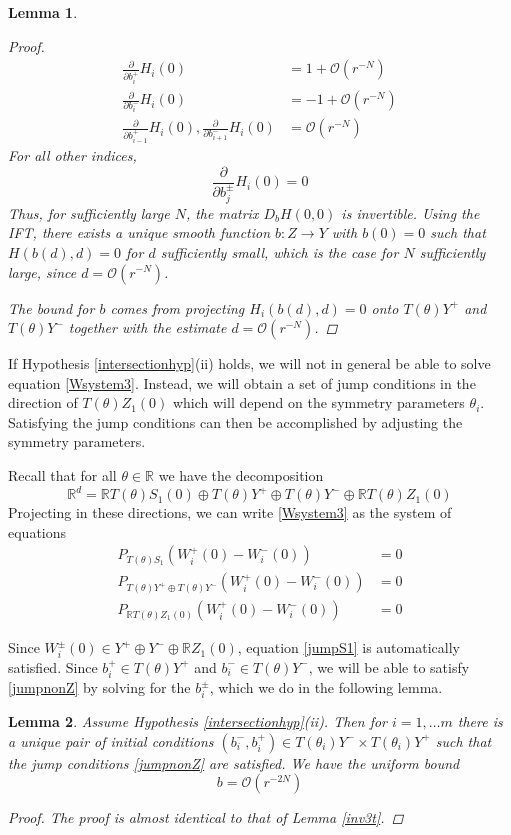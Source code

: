 \documentclass[12pt]{article}
\def\R{{\mathbb R}}
\newtheorem{lemma}{Lemma}
\begin{document}
\begin{lemma}
\begin{proof}
\begin{align*}
\frac{\partial}{\partial b_i^+}H_i(0) &= 1 + \mathcal{O}(r^{-N})  \\
\frac{\partial}{\partial b_i^-}H_i(0) &= -1 + \mathcal{O}(r^{-N}) \\
\frac{\partial}{\partial b_{i-1}^+}H_i(0),
\frac{\partial}{\partial b_{i+1}^-}H_i(0) &= \mathcal{O}(r^{-N})
\end{align*}
For all other indices,
\[
\frac{\partial}{\partial b_j^\pm}H_i(0) = 0
\]
Thus, for sufficiently large $N$, the matrix $D_b H(0,0)$ is invertible. Using the IFT, there exists a unique smooth function $b: Z \rightarrow Y$ with $b(0) = 0$ such that $H(b(d),d) = 0$ for $d$ sufficiently small, which is the case for $N$ sufficiently large, since $d = \mathcal{O}(r^{-N})$.

The bound for $b$ comes from projecting $H_i(b(d), d) = 0$ onto $T(\theta)Y^+$ and $T(\theta)Y^-$ together with the estimate $d = \mathcal{O}(r^{-N})$.
\end{proof}
\end{lemma}

If Hypothesis \ref{intersectionhyp}(ii) holds, we will not in general be able to solve equation \eqref{Wsystem3}. Instead, we will obtain a set of jump conditions in the direction of $T(\theta) Z_1(0)$ which will depend on the symmetry parameters $\theta_i$. Satisfying the jump conditions can then be accomplished by adjusting the symmetry parameters.

Recall that for all $\theta \in \R$ we have the decomposition
\[
\R^d = \R T(\theta) S_1(0) \oplus T(\theta) Y^+ \oplus T(\theta) Y^- \oplus \R T(\theta) Z_1(0)
\]
Projecting in these directions, we can write \eqref{Wsystem3} as the system of equations
\begin{align}
P_{T(\theta)S_1}\left( W_i^+(0) - W_i^-(0) \right) &= 0 \label{jumpS1} \\
P_{T(\theta)Y^+ \oplus T(\theta)Y^-}\left( W_i^+(0) - W_i^-(0) \right) &= 0 \label{jumpnonZ} \\
P_{\R T(\theta)Z_1(0)} \left( W_i^+(0) - W_i^-(0) \right) &= 0 \label{jumpZ}
\end{align}

Since $W_i^\pm(0) \in Y^+ \oplus Y^- \oplus \R Z_1(0)$, equation \ref{jumpS1} is automatically satisfied. Since $b_i^+ \in T(\theta) Y^+$ and $b_i^- \in T(\theta) Y^-$, we will be able to satisfy \eqref{jumpnonZ} by solving for the $b_i^\pm$, which we do in the following lemma.

\begin{lemma}\label{inv3nt}
Assume Hypothesis \ref{intersectionhyp}(ii). Then for $i = 1, \dots m$ there is a unique pair of initial conditions $(b_i^-, b_i^+) \in T(\theta_i) Y^- \times T(\theta_i) Y^+$ such that the jump conditions \eqref{jumpnonZ} are satisfied. We have the uniform bound
\begin{equation}\label{bboundt}
b = \mathcal{O}(r^{-2N})
\end{equation}
\begin{proof}
The proof is almost identical to that of Lemma \ref{inv3t}.
\end{proof}
\end{lemma}
\end{document}
